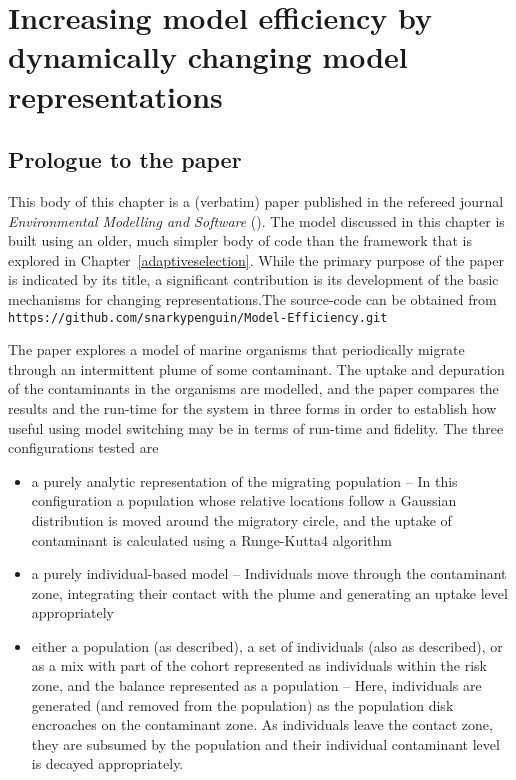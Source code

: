 \chapter[INCREASING MODEL EFFICIENCY BY DYNAMICALLY CHANGING MODEL
  REPRESENTATIONS]{ Increasing model efficiency by dynamically
  changing model representations}\label{modelefficiency}

\WeAreOn{\ctwo}
\section{Prologue to the paper}
This body of this chapter is a (verbatim) paper published in the
refereed journal \emph{Environmental Modelling and Software\/}
(\cite{gray2012adaptive}).  The model discussed in this chapter is
built using an older, much simpler body of code than the framework
that is explored in Chapter~\ref{adaptiveselection}. While the primary
purpose of the paper is indicated by its title, a significant
contribution is its development of the basic mechanisms for
changing representations.The source-code can be
obtained from\linebreak
\texttt{https://github.com/snarkypenguin/Model-Efficiency.git}

The paper explores a model of marine organisms that periodically
migrate through an intermittent plume of some contaminant.  The uptake
and depuration of the contaminants in the organisms are modelled, and
the paper compares the results and the run-time for the system in three
forms in order to establish how useful using model switching may be in
terms of run-time and fidelity.  The three configurations tested are
\begin{itemize}
\item a purely analytic representation of the
  migrating population -- In this configuration a population whose
  relative locations follow a Gaussian distribution is moved around the
  migratory circle, and the uptake of contaminant is calculated using
  a Runge-Kutta4 algorithm
\item a purely individual-based model -- Individuals move through the
  contaminant zone, integrating their contact with the plume and
  generating an uptake level appropriately
\item either a population (as described), a set of individuals (also
  as described), or as a mix with part of the cohort represented as
  individuals within the risk zone, and the balance represented as a
  population -- Here, individuals are generated (and removed from the
  population) as the population disk encroaches on the contaminant
  zone. As individuals leave the contact zone, they are subsumed by
  the population and their individual contaminant level is decayed
  appropriately.
\end{itemize}

